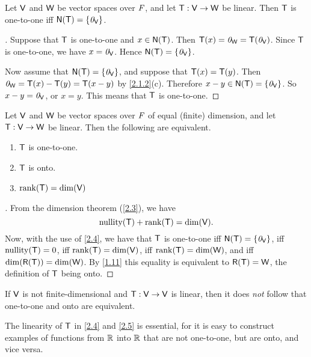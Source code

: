 \begin{thm}\label{2.4}
  Let \(\mathsf{V}\) and \(\mathsf{W}\) be vector spaces over \(\mathit{F}\), and let \(\mathsf{T} : \mathsf{V} \to \mathsf{W}\) be linear.
  Then \(\mathsf{T}\) is one-to-one iff \(\ns{\T} = \set{\zv_{\V}}\).
\end{thm}

\begin{proof}[]
  Suppose that \(\mathsf{T}\) is one-to-one and \(x \in \ns{\T}\).
  Then \(\mathsf{T}(x) = \mathit{0}_{\mathsf{W}} = \mathsf{T}(\mathit{0}_{\mathsf{V}})\).
  Since \(\mathsf{T}\) is one-to-one, we have \(x = \mathit{0}_{\mathsf{V}}\).
  Hence \(\ns{\T} = \set{\zv_{\V}}\).

  Now assume that \(\ns{\T} = \set{\zv_{\V}}\), and suppose that \(\mathsf{T}(x) = \mathsf{T}(y)\).
  Then \(\mathit{0}_{\mathsf{W}} = \mathsf{T}(x) - \mathsf{T}(y) = \mathsf{T}(x - y)\) by \cref{2.1.2}(c).
  Therefore \(x - y \in \ns{\T} = \set{\zv_{\V}}\).
  So \(x - y = \mathit{0}_{\mathsf{V}}\), or \(x = y\).
  This means that \(\mathsf{T}\) is one-to-one.
\end{proof}

\begin{thm}\label{2.5}
  Let \(\mathsf{V}\) and \(\mathsf{W}\) be vector spaces over \(\mathit{F}\) of equal (finite) dimension, and let \(\mathsf{T} : \mathsf{V} \to \mathsf{W}\) be linear.
  Then the following are equivalent.
  \begin{enumerate}
    \item \(\mathsf{T}\) is one-to-one.
    \item \(\mathsf{T}\) is onto.
    \item \(\rk{\T} = \dim(\V)\)
  \end{enumerate}
\end{thm}

\begin{proof}[]
  From the dimension theorem (\cref{2.3}), we have
  \[
    \nt{\T} + \rk{\T} = \dim(\V).
  \]
  Now, with the use of \cref{2.4}, we have that \(\mathsf{T}\) is one-to-one iff \(\ns{\T} = \set{\zv_{\V}}\), iff \(\nt{\T} = 0\), iff \(\rk{\T} = \dim(\V)\), iff \(\rk{\T} = \dim(\W)\), and iff \(\dim(\rg{\T}) = \dim(\W)\).
  By \cref{1.11} this equality is equivalent to \(\rg{\T} = \W\), the definition of \(\mathsf{T}\) being onto.
\end{proof}

\begin{note}
  If \(\mathsf{V}\) is not finite-dimensional and \(\mathsf{T} : \mathsf{V} \to \mathsf{V}\) is linear, then it does \emph{not} follow that one-to-one and onto are equivalent.

  The linearity of \(\mathsf{T}\) in \cref{2.4} and \cref{2.5} is essential, for it is easy to construct examples of functions from \(\mathbb{R}\) into \(\mathbb{R}\) that are not one-to-one, but are onto, and vice versa.
\end{note}


